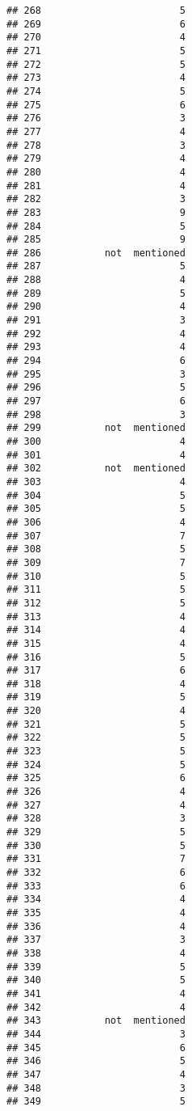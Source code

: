 \documentclass[
]{article}
\begin{document}
\begin{verbatim}
## 268                        5
## 269                        6
## 270                        4
## 271                        5
## 272                        5
## 273                        4
## 274                        5
## 275                        6
## 276                        3
## 277                        4
## 278                        3
## 279                        4
## 280                        4
## 281                        4
## 282                        3
## 283                        9
## 284                        5
## 285                        9
## 286           not  mentioned
## 287                        5
## 288                        4
## 289                        5
## 290                        4
## 291                        3
## 292                        4
## 293                        4
## 294                        6
## 295                        3
## 296                        5
## 297                        6
## 298                        3
## 299           not  mentioned
## 300                        4
## 301                        4
## 302           not  mentioned
## 303                        4
## 304                        5
## 305                        5
## 306                        4
## 307                        7
## 308                        5
## 309                        7
## 310                        5
## 311                        5
## 312                        5
## 313                        4
## 314                        4
## 315                        4
## 316                        5
## 317                        6
## 318                        4
## 319                        5
## 320                        4
## 321                        5
## 322                        5
## 323                        5
## 324                        5
## 325                        6
## 326                        4
## 327                        4
## 328                        3
## 329                        5
## 330                        5
## 331                        7
## 332                        6
## 333                        6
## 334                        4
## 335                        4
## 336                        4
## 337                        3
## 338                        4
## 339                        5
## 340                        5
## 341                        4
## 342                        4
## 343           not  mentioned
## 344                        3
## 345                        6
## 346                        5
## 347                        4
## 348                        3
## 349                        5

\end{verbatim}
\end{document}
